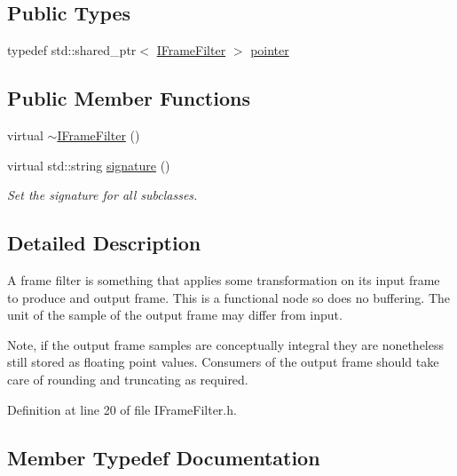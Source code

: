 \subsection*{Public Types}
\begin{DoxyCompactItemize}
\item 
typedef std\+::shared\+\_\+ptr$<$ \hyperlink{class_wire_cell_1_1_i_frame_filter}{I\+Frame\+Filter} $>$ \hyperlink{class_wire_cell_1_1_i_frame_filter_ada9e2548319a557401707cbc299166f0}{pointer}
\end{DoxyCompactItemize}
\subsection*{Public Member Functions}
\begin{DoxyCompactItemize}
\item 
virtual \hyperlink{class_wire_cell_1_1_i_frame_filter_a5a59a124637dd0cbe7ff6840dbd341f1}{$\sim$\+I\+Frame\+Filter} ()
\item 
virtual std\+::string \hyperlink{class_wire_cell_1_1_i_frame_filter_ad6ce7c354f616ea9eec2f857165f936d}{signature} ()
\begin{DoxyCompactList}\small\item\em Set the signature for all subclasses. \end{DoxyCompactList}\end{DoxyCompactItemize}


\subsection{Detailed Description}
A frame filter is something that applies some transformation on its input frame to produce and output frame. This is a functional node so does no buffering. The unit of the sample of the output frame may differ from input.

Note, if the output frame samples are conceptually integral they are nonetheless still stored as floating point values. Consumers of the output frame should take care of rounding and truncating as required. 

Definition at line 20 of file I\+Frame\+Filter.\+h.



\subsection{Member Typedef Documentation}
\mbox{\label{class_wire_cell_1_1_i_frame_filter_ada9e2548319a557401707cbc299166f0}} 
